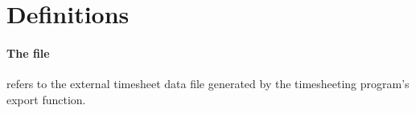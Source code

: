 \section{Definitions} \label{sec:definitions}
\paragraph{The file} refers to the external timesheet data file generated by
the timesheeting program's export function.
